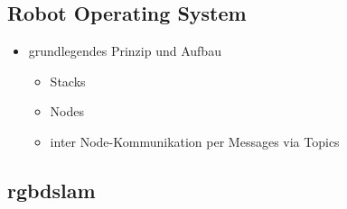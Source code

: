 \subsection{Robot Operating System}
\begin{itemize}
  \item grundlegendes Prinzip und Aufbau
  \begin{itemize}
    \item Stacks
    \item Nodes
    \item inter Node-Kommunikation per Messages via Topics
  \end{itemize}
\end{itemize}

\subsection{rgbdslam}

